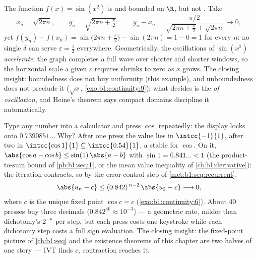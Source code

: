 \begin{example}\label{ex:b1:continuity:sinx2}
The function $f(x) = \sin(x^2)$ is  and bounded on
$\R$, but not . Take
\[
x_n = \sqrt{2\pi n}, \qquad y_n = \sqrt{2\pi n + \tfrac\pi2}:
\qquad
y_n - x_n = \frac{\pi/2}{\sqrt{2\pi n + \frac\pi2} +
\sqrt{2\pi n}} \longrightarrow 0 ,
\]
yet $f(y_n) - f(x_n) = \sin\bigl(2\pi n + \frac\pi2\bigr) -
\sin(2\pi n) = 1 - 0 = 1$ for every $n$: no single $\delta$ can
serve $\varepsilon = \frac12$ everywhere. Geometrically, the
oscillations of $\sin(x^2)$ \emph{accelerate}: the graph
completes a full wave over shorter and shorter windows, so the
horizontal scale a given $\varepsilon$ requires shrinks to zero
as $x$ grows. The closing insight: boundedness does not buy
uniformity (this example), and unboundedness does not preclude
it ($\sqrt x$, \cref{exo:b1:continuity:9}); what decides is the
\emph{ of oscillation}, and Heine's theorem says compact
domains discipline it automatically.
\end{example}

\begin{example}\label{ex:b1:continuity:cositeration}
Type any number into a calculator and press $\cos$ repeatedly:
the display locks onto $0.7390851\dots$ Why? After one press the
value lies in $\intcc{-1}{1}$, after two in $\intcc{\cos 1}{1}
\subseteq \intcc{0.54}{1}$, a stable  for $\cos$. On it,
$\abs{\cos a - \cos b} \leq \sin(1)\,\abs{a - b}$ with $\sin 1 =
0.841\dots < 1$ (the product-to-sum bound of
\cref{pb:b1:seq:1}, or the mean value inequality of
\cref{ch:b1:derivative}): the iteration contracts, so by the
error-control step of \cref{met:b1:seq:recurrent},
\[
\abs{u_n - c} \leq (0.842)^{\,n-2}\,\abs{u_2 - c}
\longrightarrow 0 ,
\]
where $c$ is the unique fixed point $\cos c = c$
(\cref{exo:b1:continuity:6}). About $40$ presses buy three
decimals ($0.842^{40} \approx 10^{-3}$) --- a geometric rate,
milder than dichotomy's $2^{-n}$ per step, but each press costs
one keystroke while each dichotomy step costs a full sign
evaluation. The closing insight: the fixed-point picture of
\cref{ch:b1:seq} and the existence theorems of this chapter are
two halves of one story --- IVT finds $c$, contraction reaches
it.
\end{example}

